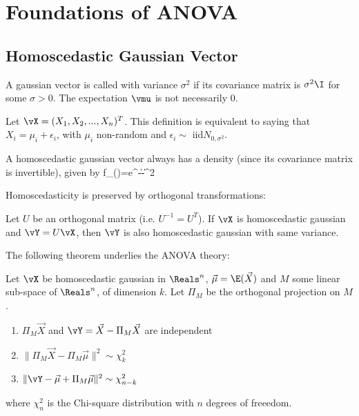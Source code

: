 %
\section{Foundations of ANOVA}
\subsection{Homoscedastic Gaussian Vector}
\begin{definition}
 A gaussian vector is called 
with variance $\sigma^2$ if its covariance matrix is $\sigma^2 \I$
for some $\sigma
>0$. The expectation $\vmu$ is not necessarily $0$.
\end{definition}
Let $\vX=(X_1,X_2,...,X_n)^T$. This definition is
equivalent to saying that $X_i=\mu_i +\epsilon_i$,
with $\mu_i$ non-random and $\epsilon_i\sim \mbox{ iid
} N_{0,\sigma^2}$.

A homoscedastic gaussian vector always has a density (since its
covariance matrix is invertible), given by
 \be
f_{\vX}(\vx)=e^{-\|\vx-\vec{\mu}\|^2}
 \ee


Homoscedasticity is preserved by orthogonal transformations:
\begin{theorem}
  Let $U$ be an orthogonal matrix
 (i.e. $U^{-1}=U^T$).
If $\vX$ is homoscedastic gaussian and $\vY=U \vX$, then $\vY$ is
also homoscedastic gaussian with same variance.
\end{theorem}

The following theorem underlies the ANOVA theory:
\begin{theorem}
Let $\vX$ be homoscedastic
gaussian in $\Reals^n$, $\vec{\mu}=\E(\vec{X})$ and
$M$ some linear sub-space of $\Reals^n$, of dimension
$k$. Let $\Pi_M$ be the orthogonal projection on $M$.
 \begin{enumerate}
  \item
 $\Pi_M\vec{X}$ and $\vY=\vec{X}-\Pi_M\vec{X}$ are
independent
\item $\|\Pi_M\vec{X}-\Pi_M\vec{\mu}\|^2\sim
\chi^2_k$ \item $\|\vY-\vec{\mu}+\Pi_M\vec{\mu}\|^2
\sim \chi^2_{n-k}$
\end{enumerate} where $\chi^2_n$ is the Chi-square distribution
with $n$ degrees of freeedom.
\end{theorem}

